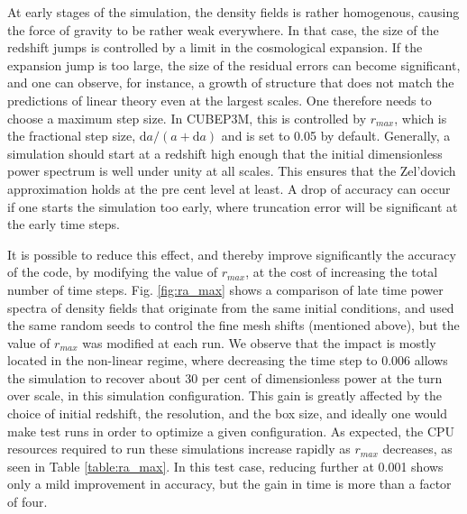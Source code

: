 At early stages of the simulation, the density fields is rather homogenous, causing the force of gravity to be
rather weak everywhere. In that case, the size of the redshift jumps is controlled by a limit in the cosmological expansion.
If the expansion jump is too large, the size of the residual errors can become significant, and one can observe, for instance,
a growth of structure that does not match the predictions of  linear theory even at the largest scales.
One therefore needs to choose a maximum step size. In {\small CUBEP3M}, this is controlled by $r_{max}$, which is the fractional step size,
$\mbox{d}a/(a + \mbox{d}a)$ and is set to 0.05 by default.  Generally, a simulation should start at a redshift high enough that
the initial dimensionless power spectrum is well under unity at all scales. This ensures that the Zel'dovich approximation
 holds at the pre cent level at least. A drop of accuracy can occur if one starts the simulation too early, where
 truncation error will be significant at the early time steps.


It is possible to reduce this effect, and thereby improve significantly 
the accuracy of the code, by modifying the value of $r_{max}$, at the cost of increasing the total number of time steps.
Fig. \ref{fig:ra_max} shows a comparison of late time power spectra of density fields that originate from the same initial conditions, and used the same random seeds to control the fine mesh shifts (mentioned above), but the value of $r_{max}$ was modified at each run. 
We observe that the impact is mostly located in the non-linear regime, where decreasing the time step to 0.006 
allows the simulation to recover about 30 per cent of dimensionless power at the turn over scale, in this simulation configuration.
This gain is greatly affected by the choice of initial redshift, the resolution, and the box size, and ideally one would make
test runs in order to optimize a given configuration.  
As expected, the {\small CPU} resources required to run these simulations increase rapidly as $r_{max}$ decreases, as seen in Table \ref{table:ra_max}. 
In this test case, reducing further at 0.001 shows only a mild improvement in accuracy, but the gain in time is more than a factor of four.


